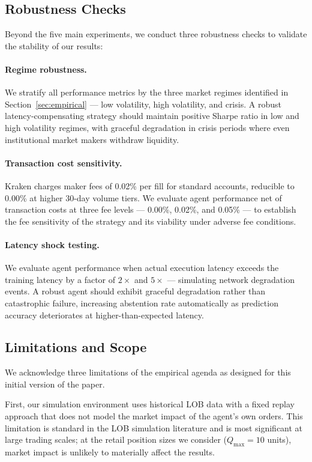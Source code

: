 \documentclass[12pt]{article}
\begin{document}
\subsection{Robustness Checks}

Beyond the five main experiments, we conduct three robustness checks to validate the stability of our results:

\paragraph{Regime robustness.} We stratify all performance metrics by the three market regimes identified in Section~\ref{sec:empirical} --- low volatility, high volatility, and crisis. A robust latency-compensating strategy should maintain positive Sharpe ratio in low and high volatility regimes, with graceful degradation in crisis periods where even institutional market makers withdraw liquidity.

\paragraph{Transaction cost sensitivity.} Kraken charges maker fees of 0.02\% per fill for standard accounts, reducible to 0.00\% at higher 30-day volume tiers. We evaluate agent performance net of transaction costs at three fee levels --- 0.00\%, 0.02\%, and 0.05\% --- to establish the fee sensitivity of the strategy and its viability under adverse fee conditions.

\paragraph{Latency shock testing.} We evaluate agent performance when actual execution latency exceeds the training latency by a factor of $2\times$ and $5\times$ --- simulating network degradation events. A robust agent should exhibit graceful degradation rather than catastrophic failure, increasing abstention rate automatically as prediction accuracy deteriorates at higher-than-expected latency.

\subsection{Limitations and Scope}

We acknowledge three limitations of the empirical agenda as designed for this initial version of the paper.

First, our simulation environment uses historical LOB data with a fixed replay approach that does not model the market impact of the agent's own orders. This limitation is standard in the LOB simulation literature and is most significant at large trading scales; at the retail position sizes we consider ($Q_{\max} = 10$ units), market impact is unlikely to materially affect the results.
\end{document}
